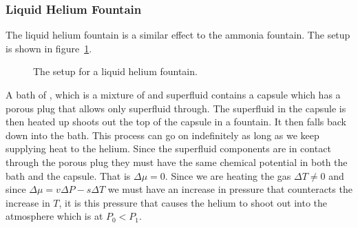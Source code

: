     \subsubsection{Liquid Helium Fountain}
    The liquid helium fountain is a similar effect to the ammonia fountain.
    The setup is shown in figure~\ref{fig:liquid He fountain}.
    \begin{figure}[ht]
        \centering
        \caption{The setup for a liquid helium fountain.}
        \label{fig:liquid He fountain}
    \end{figure}
    A bath of , which is a mixture of  and superfluid  contains a capsule which has a porous plug that allows only superfluid  through.
    The superfluid  in the capsule is then heated up shoots out the top of the capsule in a fountain.
    It then falls back down into the bath.
    This process can go on indefinitely as long as we keep supplying heat to the helium.
    Since the superfluid components are in contact through the porous plug they must have the same chemical potential in both the bath and the capsule.
    That is \(\Delta \mu = 0\).
    Since we are heating the gas \(\Delta T \ne 0\) and since \(\Delta \mu = v\Delta P - s\Delta T\) we must have an increase in pressure that counteracts the increase in \(T\), it is this pressure that causes the helium to shoot out into the atmosphere which is at \(P_0 < P_1\).
    
